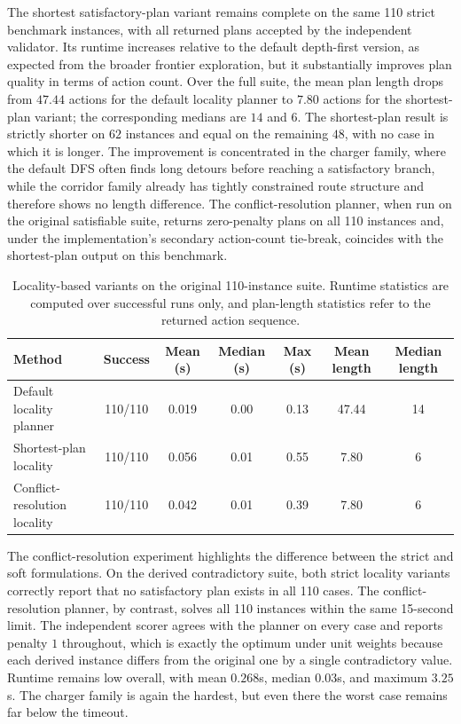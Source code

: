 \documentclass[]{jair}
\begin{document}
The shortest satisfactory-plan variant remains complete on the same 110 strict benchmark instances, with all returned plans accepted by the independent validator. Its runtime increases relative to the default depth-first version, as expected from the broader frontier exploration, but it substantially improves plan quality in terms of action count. Over the full suite, the mean plan length drops from $47.44$ actions for the default locality planner to $7.80$ actions for the shortest-plan variant; the corresponding medians are $14$ and $6$. The shortest-plan result is strictly shorter on $62$ instances and equal on the remaining $48$, with no case in which it is longer. The improvement is concentrated in the charger family, where the default DFS often finds long detours before reaching a satisfactory branch, while the corridor family already has tightly constrained route structure and therefore shows no length difference. The conflict-resolution planner, when run on the original satisfiable suite, returns zero-penalty plans on all 110 instances and, under the implementation's secondary action-count tie-break, coincides with the shortest-plan output on this benchmark.

\begin{table}[ht!]
\centering
\caption{Locality-based variants on the original 110-instance suite. Runtime statistics are computed over successful runs only, and plan-length statistics refer to the returned action sequence.}
\label{t:eval-variants}
\begin{tabular}{lcccccc}
\toprule
Method & Success & Mean (s) & Median (s) & Max (s) & Mean length & Median length \\
\midrule
Default locality planner & 110/110 & 0.019 & 0.00 & 0.13 & 47.44 & 14 \\
Shortest-plan locality & 110/110 & 0.056 & 0.01 & 0.55 & 7.80 & 6 \\
Conflict-resolution locality & 110/110 & 0.042 & 0.01 & 0.39 & 7.80 & 6 \\
\bottomrule
\end{tabular}
\end{table}

The conflict-resolution experiment highlights the difference between the strict and soft formulations. On the derived contradictory suite, both strict locality variants correctly report that no satisfactory plan exists in all 110 cases. The conflict-resolution planner, by contrast, solves all 110 instances within the same 15-second limit. The independent scorer agrees with the planner on every case and reports penalty $1$ throughout, which is exactly the optimum under unit weights because each derived instance differs from the original one by a single contradictory value. Runtime remains low overall, with mean $0.268$s, median $0.03$s, and maximum $3.25$s. The charger family is again the hardest, but even there the worst case remains far below the timeout.
\end{document}
